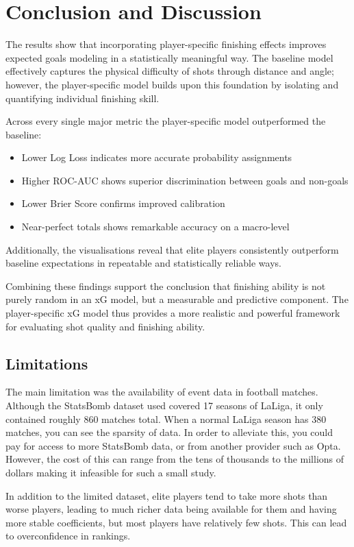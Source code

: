 \documentclass{article}
\begin{document}
\section{Conclusion and Discussion}
The results show that incorporating player-specific finishing effects improves expected goals modeling in a statistically meaningful way. The baseline model effectively captures the physical difficulty of shots through distance and angle; however, the player-specific model builds upon this foundation by isolating and quantifying individual finishing skill.

Across every single major metric the player-specific model outperformed the baseline:
\begin{itemize}
    \item Lower Log Loss indicates more accurate probability assignments
    \item Higher ROC-AUC shows superior discrimination between goals and non-goals
    \item Lower Brier Score confirms improved calibration
    \item Near-perfect totals shows remarkable accuracy on a macro-level
\end{itemize}
Additionally, the visualisations reveal that elite players consistently outperform baseline expectations in repeatable and statistically reliable ways.

Combining these findings support the conclusion that finishing ability is not purely random in an xG model, but a measurable and predictive component. The player-specific xG model thus provides a more realistic and powerful framework for evaluating shot quality and finishing ability.

\subsection{Limitations}
The main limitation was the availability of event data in football matches. Although the StatsBomb dataset used covered 17 seasons of LaLiga, it only contained roughly 860 matches total. When a normal LaLiga season has 380 matches, you can see the sparsity of data. In order to alleviate this, you could pay for access to more StatsBomb data, or from another provider such as Opta. However, the cost of this can range from the tens of thousands to the millions of dollars making it infeasible for such a small study.

In addition to the limited dataset, elite players tend to take more shots than worse players, leading to much richer data being available for them and having more stable coefficients, but most players have relatively few shots. This can lead to overconfidence in rankings.
\end{document}
